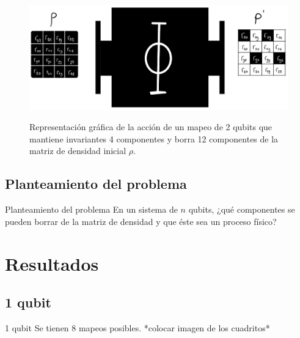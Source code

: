 \documentclass[11pt]{beamer}
\begin{document}
\begin{frame}

\begin{figure}[H]
\centering
\includegraphics[width=0.9\linewidth]{img-congreso/2qubits.pdf}
\label{fig:1qubit-draw}
\caption{Representación gráfica de la acción de un mapeo de 2 qubits que mantiene invariantes 4 componentes y borra 12 componentes de la matriz de densidad inicial $\rho$.}
\end{figure}

\end{frame}

\subsection{Planteamiento del problema}
\begin{frame}{Planteamiento del problema}
	En un sistema de $n$ qubits, ¿qué componentes se pueden borrar de 
	la matriz de densidad y que éste sea un proceso físico?
\end{frame}

\section{Resultados}

\subsection{1 qubit}
\begin{frame}{1 qubit}
Se tienen 8 mapeos posibles. *colocar imagen de los cuadritos*
\end{frame}
\end{document}
